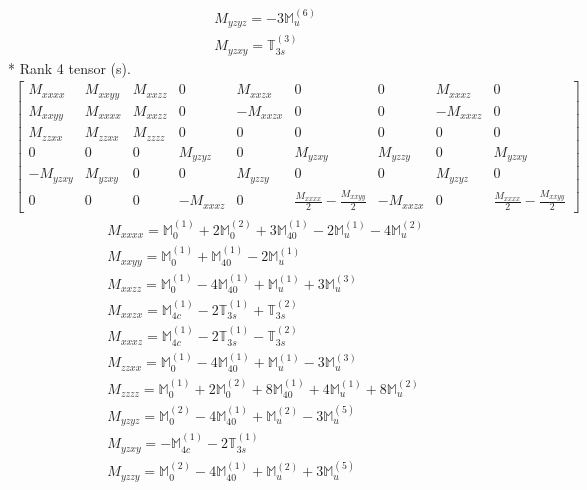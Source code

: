 \documentclass[fleqn,8pt,landscape]{jsarticle}
\begin{document}
\begin{align*}
& M_{yzyz} = - 3 \mathbb{M}_{u}^{(6)} \\
& M_{yzxy} = \mathbb{T}_{3s}^{(3)}
\end{align*}
* Rank 4 tensor (s).
\begin{align*}
\begin{bmatrix} M_{xxxx} & M_{xxyy} & M_{xxzz} & 0 & M_{xxzx} & 0 & 0 & M_{xxxz} & 0 \\ M_{xxyy} & M_{xxxx} & M_{xxzz} & 0 & - M_{xxzx} & 0 & 0 & - M_{xxxz} & 0 \\ M_{zzxx} & M_{zzxx} & M_{zzzz} & 0 & 0 & 0 & 0 & 0 & 0 \\ 0 & 0 & 0 & M_{yzyz} & 0 & M_{yzxy} & M_{yzzy} & 0 & M_{yzxy} \\ - M_{yzxy} & M_{yzxy} & 0 & 0 & M_{yzzy} & 0 & 0 & M_{yzyz} & 0 \\ 0 & 0 & 0 & - M_{xxxz} & 0 & \frac{M_{xxxx}}{2} - \frac{M_{xxyy}}{2} & - M_{xxzx} & 0 & \frac{M_{xxxx}}{2} - \frac{M_{xxyy}}{2} \end{bmatrix}
\end{align*}
\begin{align*}
& M_{xxxx} = \mathbb{M}_{0}^{(1)} + 2 \mathbb{M}_{0}^{(2)} + 3 \mathbb{M}_{40}^{(1)} - 2 \mathbb{M}_{u}^{(1)} - 4 \mathbb{M}_{u}^{(2)} \\
& M_{xxyy} = \mathbb{M}_{0}^{(1)} + \mathbb{M}_{40}^{(1)} - 2 \mathbb{M}_{u}^{(1)} \\
& M_{xxzz} = \mathbb{M}_{0}^{(1)} - 4 \mathbb{M}_{40}^{(1)} + \mathbb{M}_{u}^{(1)} + 3 \mathbb{M}_{u}^{(3)} \\
& M_{xxzx} = \mathbb{M}_{4c}^{(1)} - 2 \mathbb{T}_{3s}^{(1)} + \mathbb{T}_{3s}^{(2)} \\
& M_{xxxz} = \mathbb{M}_{4c}^{(1)} - 2 \mathbb{T}_{3s}^{(1)} - \mathbb{T}_{3s}^{(2)} \\
& M_{zzxx} = \mathbb{M}_{0}^{(1)} - 4 \mathbb{M}_{40}^{(1)} + \mathbb{M}_{u}^{(1)} - 3 \mathbb{M}_{u}^{(3)} \\
& M_{zzzz} = \mathbb{M}_{0}^{(1)} + 2 \mathbb{M}_{0}^{(2)} + 8 \mathbb{M}_{40}^{(1)} + 4 \mathbb{M}_{u}^{(1)} + 8 \mathbb{M}_{u}^{(2)} \\
& M_{yzyz} = \mathbb{M}_{0}^{(2)} - 4 \mathbb{M}_{40}^{(1)} + \mathbb{M}_{u}^{(2)} - 3 \mathbb{M}_{u}^{(5)} \\
& M_{yzxy} = - \mathbb{M}_{4c}^{(1)} - 2 \mathbb{T}_{3s}^{(1)} \\
& M_{yzzy} = \mathbb{M}_{0}^{(2)} - 4 \mathbb{M}_{40}^{(1)} + \mathbb{M}_{u}^{(2)} + 3 \mathbb{M}_{u}^{(5)}
\end{align*}
\end{document}
